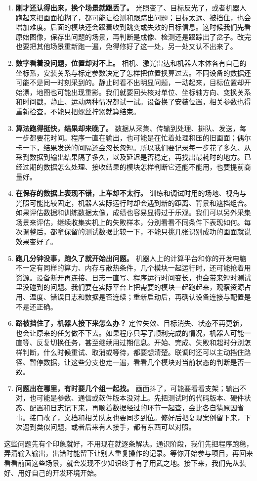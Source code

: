 \begin{enumerate}
    \item \textbf{刚才还认得出来，换个场景就跟丢了。}
    光照变了、目标反光了，或者机器人跑起来把画面拍糊了，都可能让检测和跟踪出问题；目标太远、被挡住，也会增加难度。后面的模块还会跟着收到跳变或失效的目标信息。这时候我们先看原始图像，保存出问题的场景，再判断是成像、检测还是跟踪出了岔子。改完也要把其他场景重新跑一遍，免得修好了这一处，另一处又认不出来了。

    \item \textbf{数字看着没问题，位置却对不上。}
    相机、激光雷达和机器人本体各有自己的坐标系，安装关系与标定参数决定了怎样把位置换算过去。不同设备的数据还可能不是同一时刻采到的。静止时看不出明显问题，一动起来，目标位置却开始漂，地图也可能出现重影。我们就要回头核对单位、坐标轴方向、变换关系和时间戳，静止、运动两种情况都试一试。设备换了安装位置，相关参数也得重新检查，不能只把螺丝拧紧就算结束。

    \item \textbf{算法跑得挺快，结果却来晚了。}
    数据从采集、传输到处理、排队、发送，每一步都要花时间。程序一直在输出，也可能是在忙着处理积压的旧画面；偶尔卡一下，结果发送的间隔还会忽长忽短。所以我们要记录每一步花了多久、从采到数据到输出结果隔了多久，以及延迟是否稳定，再找出最耗时的地方。已经过期的数据怎么处理、接收结果的模块怎样判断它还能不能用，也要提前商量好。

    \item \textbf{在保存的数据上表现不错，上车却不太行。}
    训练和调试时用的场地、视角与光照可能比较固定，机器人实际运行时却会遇到新的距离、背景和遮挡组合。如果评估数据和训练数据太像，成绩也容易显得过于乐观。我们可以另外采集场景来评估，继续收集实机上的失败样本，分别看看不同条件下表现如何。每次调整后，都拿保留的测试数据比较一下，不能只挑几张识别成功的画面就说效果变好了。

    \item \textbf{跑几分钟没事，跑久了就开始出问题。}
    机器人上的计算平台和你的开发电脑不一定有同样的算力、内存与散热条件，几个模块一起运行时，还可能抢着用资源。设备断开再连接、日志一直写、程序运行时间变长，也会带来短时测试里没碰到的问题。我们要在实际平台上把需要的模块一起跑起来，观察资源占用、温度、错误日志和数据是否连续；重新启动后，再确认设备连接与配置是不是还正确。

    \item \textbf{路被挡住了，机器人接下来怎么办？}
    定位失效、目标消失、状态不再更新，也会让原来的任务做不下去。如果程序只写了顺利完成的情况，机器人可能一直等、反复切换任务，甚至继续用过期信息。开始、完成、失败和超时分别怎样判断，什么时候重试、取消或等待，都要想清楚。联调时还可以主动挡住路径、暂停数据，让这些分支也走一遍，看看几个模块对当前状态的判断是否一致。

    \item \textbf{问题出在哪里，有时要几个组一起找。}
    画面抖了，可能要看看支架；输出不对，也可能是参数、通信或软件版本没对上。先把测试时的代码版本、硬件状态、配置和日志记下来，再顺着数据经过的环节一起查，会比各自猜原因省事。接口改了，文档和相关队友也要同步到位。修好后把复现案例留下来，下次遇到类似问题，或者后来有人接手，都有东西可以对照。
\end{enumerate}

这些问题先有个印象就好，不用现在就逐条解决。通识阶段，我们先把程序跑稳，弄清输入输出，出错时能留下让别人重复操作的记录。等你开始参与项目，再回来看看前面这些场景，就会发现不少知识终于有了用武之地。接下来，我们先从装好、用好自己的开发环境开始。
\par
\endgroup

